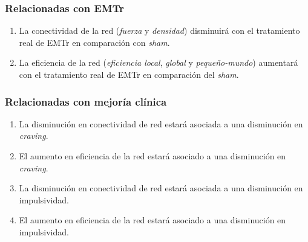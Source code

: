     \subsubsection{Relacionadas con EMTr}
    \begin{enumerate}[resume,label=Hipótesis \arabic*., left= \parindent]
        \item La conectividad de la red (\emph{fuerza} y \emph{densidad}) disminuirá con el tratamiento real de EMTr en comparación con \textit{sham}.
        \item La eficiencia de la red (\emph{eficiencia local}, \emph{global} y \emph{pequeño-mundo}) aumentará con el tratamiento real de EMTr en comparación del \textit{sham}.
    \end{enumerate}
    \subsubsection{Relacionadas con mejoría clínica}
    \begin{enumerate}[resume,label=Hipótesis \arabic*., left= \parindent]
        \item La disminución en conectividad de red estará asociada a una disminución en \textit{craving}.
        \item El aumento en eficiencia de la red estará asociado a una disminución en \textit{craving}.
        \item La disminución en conectividad de red estará asociada a una disminución en impulsividad.
        \item El aumento en eficiencia de la red estará asociado a una disminución en impulsividad.
    \end{enumerate}

